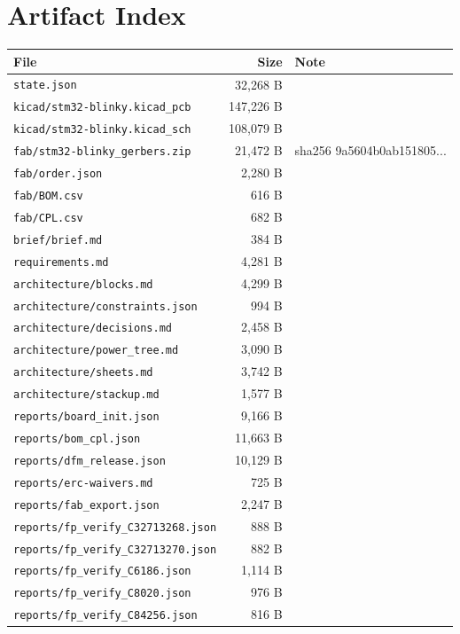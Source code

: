 \documentclass[11pt,a4paper]{article}
\begin{document}
\section{Artifact Index}
{\small
\begin{longtable}{p{9cm}rp{4cm}}
\toprule
\textbf{File} & \textbf{Size} & \textbf{Note} \\
\midrule
\endhead
\texttt{state.json} & 32,268 B &  \\
\texttt{kicad/stm32-blinky.kicad\_pcb} & 147,226 B &  \\
\texttt{kicad/stm32-blinky.kicad\_sch} & 108,079 B &  \\
\texttt{fab/stm32-blinky\_gerbers.zip} & 21,472 B & sha256 9a5604b0ab151805... \\
\texttt{fab/order.json} & 2,280 B &  \\
\texttt{fab/BOM.csv} & 616 B &  \\
\texttt{fab/CPL.csv} & 682 B &  \\
\texttt{brief/brief.md} & 384 B &  \\
\texttt{requirements.md} & 4,281 B &  \\
\texttt{architecture/blocks.md} & 4,299 B &  \\
\texttt{architecture/constraints.json} & 994 B &  \\
\texttt{architecture/decisions.md} & 2,458 B &  \\
\texttt{architecture/power\_tree.md} & 3,090 B &  \\
\texttt{architecture/sheets.md} & 3,742 B &  \\
\texttt{architecture/stackup.md} & 1,577 B &  \\
\texttt{reports/board\_init.json} & 9,166 B &  \\
\texttt{reports/bom\_cpl.json} & 11,663 B &  \\
\texttt{reports/dfm\_release.json} & 10,129 B &  \\
\texttt{reports/erc-waivers.md} & 725 B &  \\
\texttt{reports/fab\_export.json} & 2,247 B &  \\
\texttt{reports/fp\_verify\_C32713268.json} & 888 B &  \\
\texttt{reports/fp\_verify\_C32713270.json} & 882 B &  \\
\texttt{reports/fp\_verify\_C6186.json} & 1,114 B &  \\
\texttt{reports/fp\_verify\_C8020.json} & 976 B &  \\
\texttt{reports/fp\_verify\_C84256.json} & 816 B &  \\

\end{longtable}}
\end{document}
